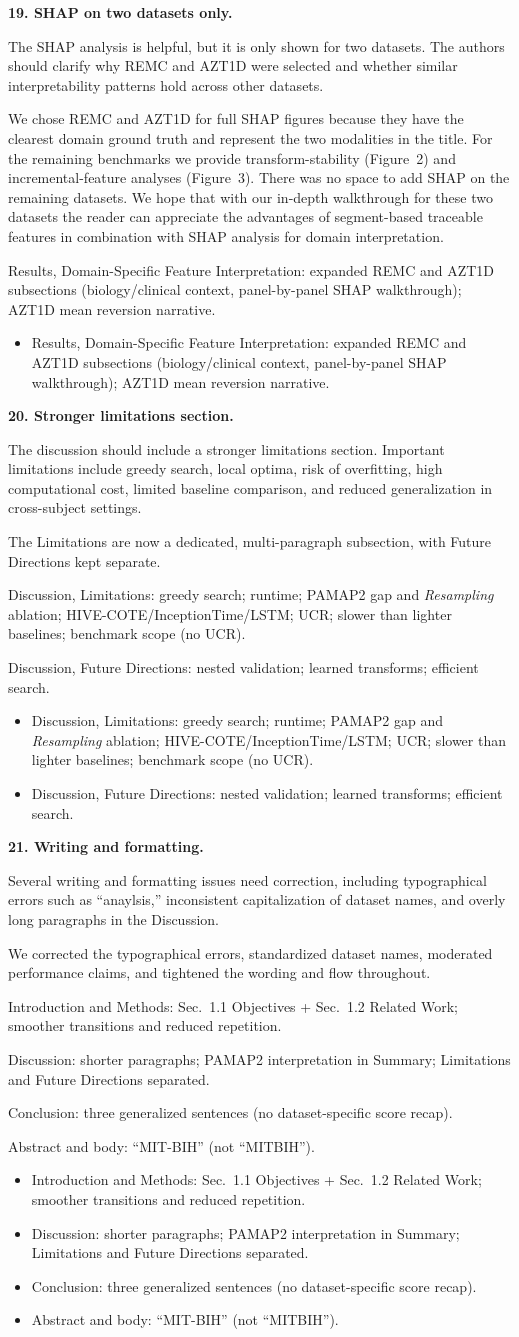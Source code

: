 \documentclass[11pt]{article}
\makeatletter
\newcommand{\rsp}{\par\vspace{0.9em}}
\newcommand{\rcitem}[2]{\begin{reviewerbox}\textbf{#1}\par\smallskip#2\end{reviewerbox}}
\newcommand{\response}[2]{%
  \begin{responsebox}#1%
  \def\@responseitems{#2}%
  \ifx\@responseitems\empty\else\begin{itemize}[nosep,leftmargin=1.2em]#2\end{itemize}\fi
  \end{responsebox}\rsp}
\makeatother
\begin{document}
\rcitem{19. SHAP on two datasets only.}{The SHAP analysis is helpful, but it is only shown for
two datasets. The authors should clarify why REMC and AZT1D were selected and whether similar
interpretability patterns hold across other datasets.}

\response{We chose REMC and AZT1D for full SHAP figures because they have the clearest domain
ground truth and represent the two modalities in the title. For the remaining benchmarks we provide
transform-stability (Figure~2) and incremental-feature analyses (Figure~3). 
There was no space to add SHAP on the remaining datasets. 
We hope that with our in-depth walkthrough for these two datasets the reader can appreciate the advantages of segment-based traceable features
in combination with SHAP analysis for domain interpretation.}{
  \item Results, Domain-Specific Feature Interpretation: expanded REMC and AZT1D subsections
    (biology/clinical context, panel-by-panel SHAP walkthrough); AZT1D mean reversion narrative.
}

\rcitem{20. Stronger limitations section.}{The discussion should include a stronger limitations
section. Important limitations include greedy search, local optima, risk of overfitting, high
computational cost, limited baseline comparison, and reduced generalization in cross-subject
settings.}

\response{The Limitations are now a dedicated, multi-paragraph subsection, with Future Directions
kept separate.}{
  \item Discussion, Limitations: greedy search; runtime; PAMAP2 gap and \emph{Resampling}
    ablation; HIVE-COTE/InceptionTime/LSTM; UCR; slower than lighter baselines; benchmark scope
    (no UCR).
  \item Discussion, Future Directions: nested validation; learned transforms; efficient search.
}

\rcitem{21. Writing and formatting.}{Several writing and formatting issues need correction,
including typographical errors such as ``anaylsis,'' inconsistent capitalization of dataset names,
and overly long paragraphs in the Discussion.}

\response{We corrected the typographical errors, standardized dataset names, moderated performance
claims, and tightened the wording and flow throughout.}{
  \item Introduction and Methods: Sec.~1.1 Objectives + Sec.~1.2 Related Work; smoother
    transitions and reduced repetition.
  \item Discussion: shorter paragraphs; PAMAP2 interpretation in Summary; Limitations and Future
    Directions separated.
  \item Conclusion: three generalized sentences (no dataset-specific score recap).
  \item Abstract and body: ``MIT-BIH'' (not ``MITBIH'').
}
\end{document}
